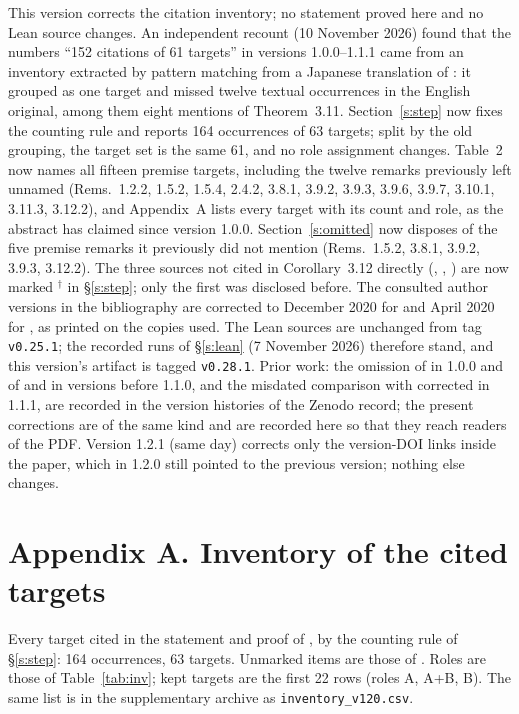 \documentclass[11pt]{article}
\theoremstyle{plain}
\theoremstyle{definition}
\theoremstyle{remark}
\begin{document}
This version corrects the citation inventory; no statement proved here and no Lean
source changes. An independent recount (10 November 2026) found that the numbers
``152 citations of 61 targets'' in versions 1.0.0--1.1.1 came from an inventory
extracted by pattern matching from a Japanese translation of \cite{IUT3}: it grouped
\cite[\S\S 4, 5, 6]{IUT1} as one target and missed twelve textual occurrences in the
English original, among them eight mentions of Theorem~3.11. Section~\ref{s:step} now
fixes the counting rule and reports 164 occurrences of 63 targets; split by the old
grouping, the target set is the same 61, and no role assignment changes. Table~2 now
names all fifteen premise targets, including the twelve remarks previously left
unnamed (Rems.~1.2.2, 1.5.2, 1.5.4, 2.4.2, 3.8.1, 3.9.2, 3.9.3, 3.9.6, 3.9.7, 3.10.1,
3.11.3, 3.12.2), and Appendix~A lists every target with its count and role, as the
abstract has claimed since version 1.0.0. Section~\ref{s:omitted} now disposes of the
five premise remarks it previously did not mention (Rems.~1.5.2, 3.8.1, 3.9.2, 3.9.3,
3.12.2). The three sources not cited in Corollary~3.12 directly
(\cite[Prop.~3.5(ii)]{IUT3}, \cite[Prop.~3.2(ii)]{IUT3}, \cite[Rem.~3.9.1]{IUT3}) are
now marked $^\dagger$ in \S\ref{s:step}; only the first was disclosed before. The
consulted author versions in the bibliography are corrected to December 2020 for
\cite{IUT2} and April 2020 for \cite{IUT4}, as printed on the copies used. The Lean
sources are unchanged from tag \texttt{v0.25.1}; the recorded runs of
\S\ref{s:lean} (7 November 2026) therefore stand, and this version's artifact is tagged
\texttt{v0.28.1}. Prior work: the omission of \cite{LANA} in 1.0.0 and of
\cite{Higuchi} and \cite{Pajo} in versions before 1.1.0, and the misdated comparison
with \cite{LANA} corrected in 1.1.1, are recorded in the version histories of the
Zenodo record; the present corrections are of the same kind and are recorded here so
that they reach readers of the PDF. Version 1.2.1 (same day) corrects only the
version-DOI links inside the paper, which in 1.2.0 still pointed to the previous
version; nothing else changes.

\appendix
\section*{Appendix A. Inventory of the cited targets}

Every target cited in the statement and proof of \cite[Cor.~3.12]{IUT3}, by the
counting rule of \S\ref{s:step}: 164 occurrences, 63 targets. Unmarked items are those
of \cite{IUT3}. Roles are those of Table~\ref{tab:inv}; kept targets are the first 22
rows (roles A, A+B, B). The same list is in the supplementary archive as
\texttt{inventory\_v120.csv}.
\end{document}
